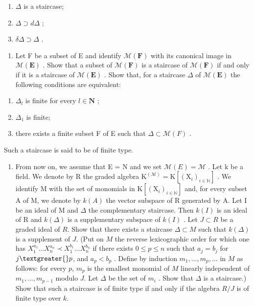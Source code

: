 \begin{enumerate}
\def\labelenumi{(\roman{enumi})}
\item
  \(\Delta\) is a staircase;
\item
  \(\Delta \supset d\Delta\) ;
\item
  \(\delta \Delta \supset \Delta\) .
\end{enumerate}

\begin{enumerate}
\def\labelenumi{\alph{enumi})}
\setcounter{enumi}{1}
\tightlist
\item
  Let F be a subset of E and identify \(\mathcal{M}(\mathbf{F})\) with its canonical image in \(\mathcal{M}(\mathbf{E})\) . Show that a subset of \(\mathcal{M}(\mathbf{F})\) is a staircase of \(\mathcal{M}(\mathbf{F})\) if and only if it is a staircase of \(\mathcal{M}(\mathbf{E})\) . Show that, for a staircase \(\Delta\) of \(\mathcal{M}(\mathbf{E})\) the following conditions are equivalent:
\end{enumerate}

\begin{enumerate}
\def\labelenumi{(\roman{enumi})}
\item
  \(\Delta_l\) is finite for every \(l \in \mathbf{N}\) ;
\item
  \(\Delta_{1}\) is finite;
\item
  there exists a finite subset F of E such that \(\Delta\subset\mathcal{M}(F)\) .
\end{enumerate}

Such a staircase is said to be of finite type.

\begin{enumerate}
\def\labelenumi{\alph{enumi})}
\setcounter{enumi}{2}
\tightlist
\item
  From now on, we assume that E = N and we set \(\mathcal{M}(E) = \mathcal{M}\) . Let k be a field. We denote by R the graded algebra \(\mathrm{K}^{(\mathcal{M})} = \mathrm{K}[(\mathrm{X}_i)_{i \in \mathbb{N}}]\) . We identify M with the set of monomials in \(\mathrm{K}[(\mathrm{X}_i)_{i \in \mathbb{N}}]\) and, for every subset A of M, we denote by \(k(A)\) the vector subspace of R generated by A. Let I be an ideal of M and \(\Delta\) the complementary staircase. Then \(k(I)\) is an ideal of R and \(k(\Delta)\) is a supplementary subspace of \(k(I)\) . Let \(J \subset R\) be a graded ideal of \(R\). Show that there exists a staircase \(\Delta \subset M\) such that \(k(\Delta)\) is a supplement of \(J\). (Put on \(M\) the reverse lexicographic order for which one has \(X_1^{a_1} \ldots X_n^{a_n} \prec X_1^{b_1} \ldots X_n^{b_n}\) if there exists \(0 \leqslant p \leqslant n\) such that \(a_j = b_j\) for \(j \textgreater{} p\), and \(a_p < b_p\) . Define by induction \(m_1, \ldots, m_p, \ldots\) in \(M\) as follows: for every \(p\), \(m_p\) is the smallest monomial of \(M\) linearly independent of \(m_1, \ldots, m_{p-1}\) modulo \(J\). Let \(\Delta\) be the set of \(m_i\) . Show that \(\Delta\) is a staircase.) Show that such a staircase is of finite type if and only if the algebra \(R/J\) is of finite type over \(k\).
\end{enumerate}

